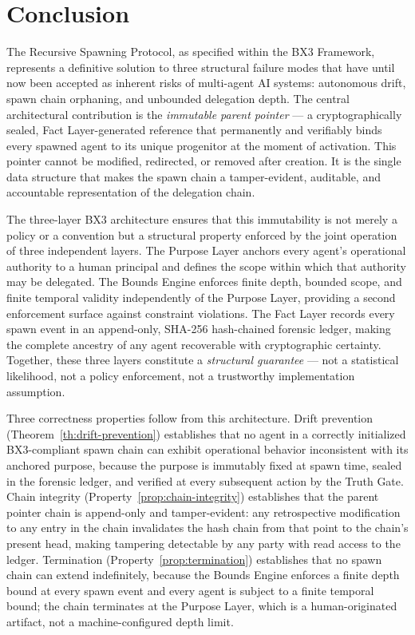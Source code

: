 
\section{Conclusion}
\label{sec:conclusion}

The Recursive Spawning Protocol, as specified within the BX3 Framework, represents a definitive solution to three structural failure modes that have until now been accepted as inherent risks of multi-agent AI systems: autonomous drift, spawn chain orphaning, and unbounded delegation depth. The central architectural contribution is the \textit{immutable parent pointer} — a cryptographically sealed, Fact Layer-generated reference that permanently and verifiably binds every spawned agent to its unique progenitor at the moment of activation. This pointer cannot be modified, redirected, or removed after creation. It is the single data structure that makes the spawn chain a tamper-evident, auditable, and accountable representation of the delegation chain.

The three-layer BX3 architecture ensures that this immutability is not merely a policy or a convention but a structural property enforced by the joint operation of three independent layers. The Purpose Layer anchors every agent's operational authority to a human principal and defines the scope within which that authority may be delegated. The Bounds Engine enforces finite depth, bounded scope, and finite temporal validity independently of the Purpose Layer, providing a second enforcement surface against constraint violations. The Fact Layer records every spawn event in an append-only, SHA-256 hash-chained forensic ledger, making the complete ancestry of any agent recoverable with cryptographic certainty. Together, these three layers constitute a \textit{structural guarantee} — not a statistical likelihood, not a policy enforcement, not a trustworthy implementation assumption.

Three correctness properties follow from this architecture. Drift prevention (Theorem~\ref{th:drift-prevention}) establishes that no agent in a correctly initialized BX3-compliant spawn chain can exhibit operational behavior inconsistent with its anchored purpose, because the purpose is immutably fixed at spawn time, sealed in the forensic ledger, and verified at every subsequent action by the Truth Gate. Chain integrity (Property~\ref{prop:chain-integrity}) establishes that the parent pointer chain is append-only and tamper-evident: any retrospective modification to any entry in the chain invalidates the hash chain from that point to the chain's present head, making tampering detectable by any party with read access to the ledger. Termination (Property~\ref{prop:termination}) establishes that no spawn chain can extend indefinitely, because the Bounds Engine enforces a finite depth bound at every spawn event and every agent is subject to a finite temporal bound; the chain terminates at the Purpose Layer, which is a human-originated artifact, not a machine-configured depth limit.

